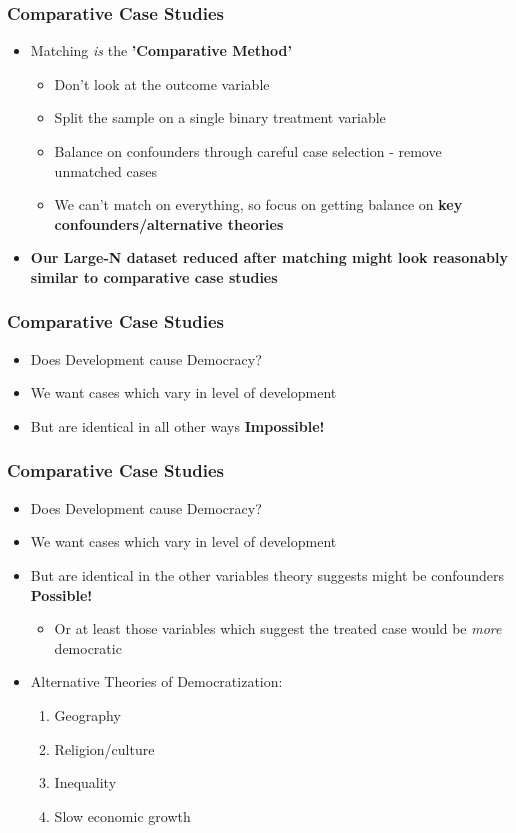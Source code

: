 \documentclass[xcolor=x11names,compress]{beamer}\usepackage[]{graphicx}\usepackage[]{color}
\renewcommand{\(}{\begin{columns}}
\renewcommand{\)}{\end{columns}}
\newcommand{\<}[1]{\begin{column}{#1}}
\renewcommand{\>}{\end{column}}
\begin{document}
\begin{frame}
\frametitle{Comparative Case Studies}
\begin{itemize}
\item Matching \textit{is} the \textbf{'Comparative Method'}
\begin{itemize}
\item Don't look at the outcome variable
\pause
\item Split the sample on a single binary treatment variable
\pause
\item Balance on confounders through careful case selection - remove unmatched cases
\pause
\item We can't match on everything, so focus on getting balance on \textbf{key confounders/alternative theories}
\pause
\end{itemize}
\item \textbf{Our Large-N dataset reduced after matching might look reasonably similar to comparative case studies}
\end{itemize}
\end{frame}

\begin{frame}
\frametitle{Comparative Case Studies}
\begin{itemize}
\item Does Development cause Democracy?
\pause
\item We want cases which vary in level of development
\pause
\item But are identical in all other ways \pause \textbf{Impossible!}
\end{itemize}
\end{frame}

\begin{frame}
\frametitle{Comparative Case Studies}
\begin{itemize}
\item Does Development cause Democracy?
\item We want cases which vary in level of development
\item But are identical in the other variables theory suggests might be confounders \pause \textbf{Possible!}
\begin{itemize}
\item Or at least those variables which suggest the treated case would be \textit{more} democratic
\end{itemize}
\pause
\item Alternative Theories of Democratization:
\begin{enumerate}
\item Geography
\pause
\item Religion/culture
\pause
\item Inequality
\pause
\item Slow economic growth
\end{enumerate}
\end{itemize}
\end{frame}
\end{document}
